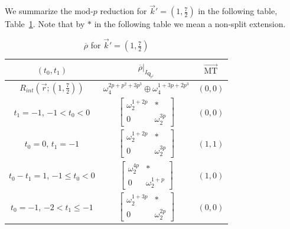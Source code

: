 \documentclass[11pt]{amsart}
\theoremstyle{definition}
\numberwithin{equation}{subsection}
\theoremstyle{plain}
\theoremstyle{plain}
\theoremstyle{plain}
\theoremstyle{plain}
\theoremstyle{plain}
\theoremstyle{plain}
\theoremstyle{plain}
\theoremstyle{plain}
\theoremstyle{plain}
\theoremstyle{plain}
\theoremstyle{plain}
\theoremstyle{plain}
\theoremstyle{definition}
\theoremstyle{definition}
\theoremstyle{definition}
\theoremstyle{remark}
\renewcommand{\(}{\textup{(}}
\renewcommand{\)}{\textup{)}}
\newcommand{\Q}{\mathbf{Q}}
\newcommand{\rhobar}{\overline{\rho}}
\newcommand{\vr}{\vec{r}}
\newcommand{\vk}{\vec{k}}
\begin{document}
We summarize the mod-$p$ reduction for $\vk'=(1,\frac{7}{2})$ in the following table, Table~\ref{tab: (1,7/2)}. Note that by $\ast$ in the following table we mean a non-split extension.
\begin{table}[htbp]%
  \centering
  \begin{tabular}{|c||c|c|}
    \hline
    $(t_0,t_1)$ & $\rhobar|_{I_{\Q_{p^2}}}$ & $\vec{\mathrm{MT}}$ \\\hline\hline
    $R_{int}(\vr;(1,\frac{7}{2}))$
      & $\omega_4^{2p+p^2+3p^3}\oplus\omega_4^{1+3p+2p^3}$ & $(0,0)$ \\\hline
    $t_1=-1$, $-1<t_0<0$
      & $
      \begin{bmatrix}
        \omega_2^{1+2p} & * \\
        0 & \omega_2^{3p}
      \end{bmatrix}$ & $(0,0)$ \\\hline
    $t_0=0$, $t_1=-1$
      & $
      \begin{bmatrix}
        \omega_2^{1+2p} & * \\
        0 & \omega_2^{3p}
      \end{bmatrix}$ & $(1,1)$ \\\hline
    $t_0-t_1=1$, $-1\leq t_0<0$
      & $
      \begin{bmatrix}
        \omega_2^{4p} & * \\
        0 & \omega_2^{1+p}
      \end{bmatrix}$ & $(1,0)$ \\\hline
    $t_0=-1$, $-2<t_1\leq -1$
      & $
      \begin{bmatrix}
        \omega_2^{1+3p} & * \\
        0 & \omega_2^{2p}
      \end{bmatrix}$ & $(0,0)$ \\\hline
  \end{tabular}
  \caption{$\rhobar$ for $\vk'=(1,\frac{7}{2})$}\label{tab: (1,7/2)}
\end{table}
\end{document}
